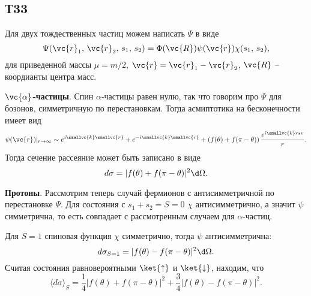 \subsection*{Т33}

Для двух тождественных частиц можем написать $\Psi$ в виде
\begin{equation*}
	\Psi(\vc{r}_1,\, \vc{r}_2,\, s_1,\, s_2) = \Phi(\vc{R}) \psi(\vc{r}) \chi(s_1,\, s_2),
\end{equation*}
для приведенной массы $\mu = m/2$, $\vc{r} = \vc{r}_1 - \vc{r}_2$, $\vc{R}$ -- коордианты центра масс. 

\textbf{$\vc{\alpha}$-частицы}. Спин $\alpha$-частицы равен нулю, так что говорим про $\Psi$ для бозонов, симметричную по перестановкам. Тогда асмиптотика на бесконечности имеет вид
\begin{equation*}
	\psi(\vc{r})|_{r\to \infty} \sim e^{i \smallvc{k} \smallvc{r}} + e^{- i \smallvc{k} \smallvc{r}} + \left(
		f(\theta) + f(\pi-\theta)
	\right) \frac{e^{i \smallvc{k} r
	sv}}{r}.
\end{equation*}
Тогда сечение рассеяние может быть записано в виде
\begin{equation*}
	d \sigma = |f(\theta) + f(\pi-\theta)|^2 \d \Omega.
\end{equation*}

\textbf{Протоны}. Рассмотрим теперь случай фермионов с антисимметричной по перестановке $\Psi$. Для состояния с $s_1 + s_2 = S = 0$ $\chi$ антисимметрично, а значит $\psi$ симметрична, то есть совпадает с рассмотренным случаем для $\alpha$-частиц. 

Для $S = 1$ спиновая функция $\chi$ симметрично, тогда $\psi$ антисимметрична:
\begin{equation*}
	d \sigma_{S=1} = |f(\theta) - f(\pi-\theta)|^2 \d \Omega.
\end{equation*}
Считая состояния равновероятными $\ket{\uparrow}$ и $\ket{\downarrow}$, находим, что
\begin{equation*}
	\langle d \sigma\rangle_S = \frac{1}{4} |f(\theta) +  f(\pi-\theta)|^2 + \frac{3}{4} |f(\theta) - f(\pi-\theta)|^2.
\end{equation*}